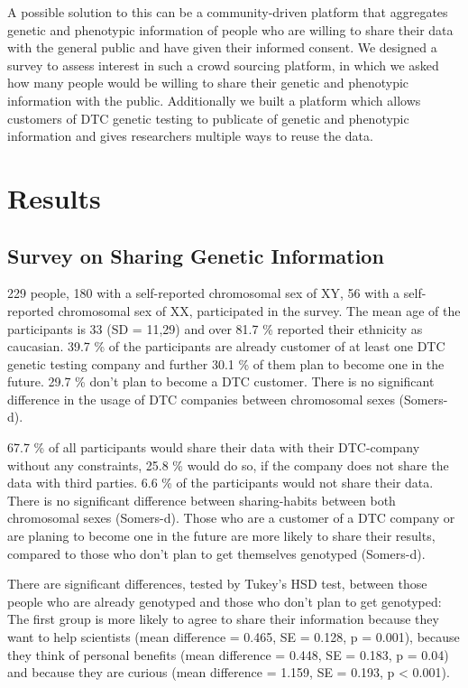 \documentclass[10pt]{article}
\begin{document}
A possible solution to this can be a community-driven platform that aggregates genetic and phenotypic information of people who are willing to share their data with the general public and have given their informed consent. We designed a survey to assess interest in such a crowd sourcing platform, in which we asked how many people would be willing to share their genetic and phenotypic information with the public. Additionally we built a platform which allows customers of DTC genetic testing to publicate of genetic and phenotypic information and gives researchers multiple ways to reuse the data. 

\section*{Results}

\subsection*{Survey on Sharing Genetic Information}
229 people, 180 with a self-reported chromosomal sex of XY, 56 with a self-reported chromosomal sex of XX, participated in the survey. The mean age of the participants is 33 (SD = 11,29) and over 81.7 \% reported their ethnicity as caucasian. 39.7 \% of the participants are already customer of at least one DTC genetic testing company and further 30.1 \% of them plan to become one in the future. 29.7 \% don't plan to become a DTC customer. There is no significant difference in the usage of DTC companies between chromosomal sexes (Somers-d). 

67.7 \% of all participants would share their data with their DTC-company without any constraints, 25.8 \% would do so, if the company does not share the data with third parties. 6.6 \% of the participants would not share their data. There is no significant difference between sharing-habits between both chromosomal sexes (Somers-d). Those who are a customer of a DTC company or are planing to become one in the future are more likely to share their results, compared to those who don't plan to get themselves genotyped (Somers-d). 

There are significant differences, tested by Tukey's HSD test, between those people who are already genotyped and those who don't plan to get genotyped: The first group is more likely to agree to share their information because they want to help scientists (mean difference = 0.465, SE = 0.128, p = 0.001), because they think of personal benefits (mean difference = 0.448, SE = 0.183, p = 0.04) and because they are curious (mean difference = 1.159, SE = 0.193, p < 0.001). 
\end{document}
